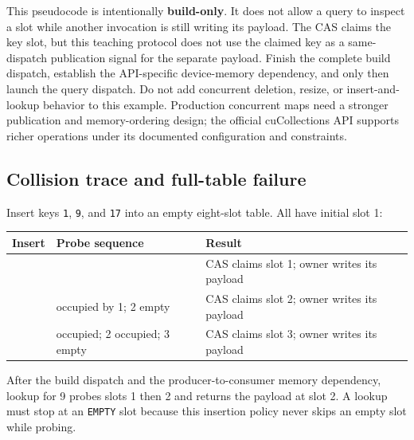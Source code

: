 This pseudocode is intentionally \textbf{build-only}. It does not allow a query to inspect a slot while another invocation is still writing its payload. The CAS claims the key slot, but this teaching protocol does not use the claimed key as a same-dispatch publication signal for the separate payload. Finish the complete build dispatch, establish the API-specific device-memory dependency, and only then launch the query dispatch. Do not add concurrent deletion, resize, or insert-and-lookup behavior to this example. Production concurrent maps need a stronger publication and memory-ordering design; the official cuCollections API supports richer operations under its documented configuration and constraints.

\subsection{Collision trace and full-table failure}\label{03-visual-computing-i-ch016-collision-trace-and-full-table-failure}

Insert keys \texttt{1}, \texttt{9}, and \texttt{17} into an empty eight-slot table. All have initial slot 1:

{\def\LTcaptype{none} %
\begin{longtable}[]{@{}
  >{\raggedright\arraybackslash}p{}
  >{\raggedright\arraybackslash}p{}
  >{\raggedright\arraybackslash}p{}@{}}
\toprule\noalign{}
\begin{minipage}[b]{\linewidth}\raggedright
Insert
\end{minipage} & \begin{minipage}[b]{\linewidth}\raggedright
Probe sequence
\end{minipage} & \begin{minipage}[b]{\linewidth}\raggedright
Result
\end{minipage} \\
\midrule\noalign{}
\endhead
\bottomrule\noalign{}
\endlastfoot
1 & 1 & CAS claims slot 1; owner writes its payload \\
9 & 1 occupied by 1; 2 empty & CAS claims slot 2; owner writes its payload \\
17 & 1 occupied; 2 occupied; 3 empty & CAS claims slot 3; owner writes its payload \\
\end{longtable}
}

After the build dispatch and the producer-to-consumer memory dependency, lookup for 9 probes slots 1 then 2 and returns the payload at slot 2. A lookup must stop at an \texttt{EMPTY} slot because this insertion policy never skips an empty slot while probing.

